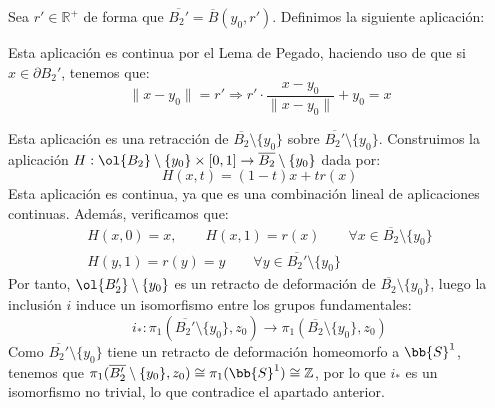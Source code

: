 \begin{ejercicio}
\begin{enumerate}[label=\alph*)]
            Sea $r'\in \mathbb{R}^+$ de forma que $\overline{B_2'} = \overline{B}(y_0,r')$. Definimos la siguiente aplicación:

            Esta aplicación es continua por el Lema de Pegado, haciendo uso de que si $x\in \partial B_2'$, tenemos que:
            \begin{equation*}
                \|x-y_0\| = r' \Longrightarrow r'\cdot \frac{x-y_0}{\|x-y_0\|} + y_0 = x
            \end{equation*}

            Esta aplicación es una retracción de $\overline{B_2}\setminus \{y_0\}$ sobre $\overline{B_2'}\setminus \{y_0\}$.  Construimos la aplicación $H:\ol{B_2}\setminus \{y_0\}\times [0,1]\to \overline{B_2}\setminus \{y_0\}$ dada por:
            \begin{equation*}
                H(x,t) = (1-t)x + tr(x)
            \end{equation*}
            Esta aplicación es continua, ya que es una combinación lineal de aplicaciones continuas. Además, verificamos que:
            \begin{gather*}
                H(x,0) = x, \qquad H(x,1) = r(x) \qquad \forall x\in \overline{B_2}\setminus \{y_0\} \\
                H(y,1) = r(y) = y \qquad \forall y\in \overline{B_2'}\setminus \{y_0\}
            \end{gather*}
            Por tanto, $\ol{B_2'}\setminus \{y_0\}$ es un retracto de deformación de $\overline{B_2}\setminus \{y_0\}$, luego la inclusión $i$ induce un isomorfismo entre los grupos fundamentales:
            \begin{equation*}
                i_\ast:\pi_1(\overline{B_2'}\setminus \{y_0\},z_0)\to \pi_1(\overline{B_2}\setminus \{y_0\},z_0)
            \end{equation*}
            Como $\overline{B_2'}\setminus \{y_0\}$ tiene un retracto de deformación homeomorfo a $\bb{S}^1$, tenemos que $\pi_1(\overline{B_2'}\setminus \{y_0\},z_0)\cong \pi_1(\bb{S}^1)\cong \mathbb{Z}$, por lo que $i_\ast$ es un isomorfismo no trivial, lo que contradice el apartado anterior.
    \end{enumerate}
\end{ejercicio}

